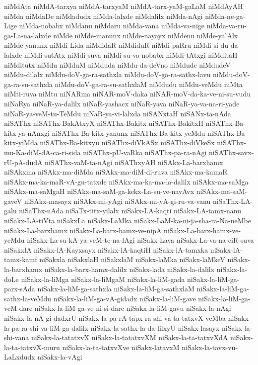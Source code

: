 {niMdAta
niMdA-tarxya
niMdA-tarxyaM
niMdA-tarx-yaM-gaLaM
niMdAyAH
niMda
niMdaDe
niMdadudx
niMda-lalxde
niMdalilx
niMda-nAgi
niMda-ne-ga-Lige
niMda-nobabx
niMdanu
niMdaru
niMda-vana
niMda-va-nige
niMda-va-ru-ga-La-na-lalxde
niMde
niMde-manunx
niMde-nayayx
niMdenu
niMde-yalAlx
niMde-yanunx
niMdi-Lida
niMdidaR
niMdiduR
niMdi-paRru
niMdi-si-du-da-lalxde
niMdi-sutAtx
niMdi-suva
niMdi-su-va-nobabx
niMdi-tAtxgi
niMditaH
niMditutx
niMdu
niMduM
niMduda
niMdu-da-deVno
niMdude
niMdudeV
niMdu-dilalx
niMdu-doV-ga-ra-sathxla
niMdu-doV-ga-ra-sathx-lavu
niMdu-doV-ga-ra-su-sathxla
niMdu-doV-ga-ra-su-sathxlaM
niMdudu
niMdu-veMdu
niMta
niMti-ruva
niMtu
niNARma
niNAR-moV-daka
niNAR-moV-da-ka-ve-ni-su-vudu
niNaRya
niNaR-ya-dalilx
niNaR-yashacx
niNaR-yava
niNaR-ya-va-na-ri-yade
niNaR-ya-veM-tu-TeMdu
niNaR-ya-vi-lalxda
niSANxtaH
niSANx-ta-nAda
niSAThx
niSAThx-BakAtxyX
niSAThx-Bakitx
niSAThx-BakitxH
niSAThx-Ba-kitx-ya-nAnxgi
niSAThx-Ba-kitx-yanunx
niSAThx-Ba-kitx-yeMdu
niSAThx-Ba-kitx-yiMda
niSAThx-Ba-kitxyu
niSAThx-diVkASx
niSAThx-diVkeSx
niSAThx-mu-Ka-diM-dA-ca-ri-sida
niSAThx-pU-vaRka
niSAThx-pa-ra-nAgi
niSAThx-savx-rU-pA-dudA
niSAThx-vaM-ta-nAgi
niSAThxyAH
niSAkx-La-barxhamx
niSAkxma
niSAkx-ma-diMda
niSAkx-ma-diM-di-ruva
niSAkx-ma-kamaR
niSAkx-ma-ka-maR-vA-gu-tatxde
niSAkx-ma-ka-ma-la-dalilx
niSAkx-ma-saMga
niSAkx-ma-saMgaH
niSAkx-ma-saM-ga-kekx-La-su-ve-navAvx
niSAkx-ma-saM-gaveV
niSAkx-masayx
niSAkx-mi-yAgi
niSAkx-mi-yA-gi-ru-va-vanu
niSaThx-LA-galu
niSaThx-nAda
niSaTx-titx-yilalx
niSakx-LA-kaqti
niSakx-LA-tamx-nanu
niSakx-LA-tiVta
niSakxLa
niSakx-LaMka
niSakx-LaM-ka-ni-ja-sha-ra-Na-neMbe
niSakx-La-barxhamx
niSakx-La-barx-hamx-ve-nipA
niSakx-La-barx-hamx-ve-yeMdu
niSakx-La-su-kA-ya-veM-te-na-lAgi
niSakx-Lava
niSakx-La-va-na-ciR-suva
niSakxlA
niSakx-lA-Kayxsayx
niSakx-lA-kaqtiH
niSakx-lA-tamxka
niSakx-lA-tamx-kamf
niSakxla
niSakxlaH
niSakxlaM
niSakx-laMka
niSakx-laMkeV
niSakx-la-barxhamx
niSakx-la-barx-hamx-dalilx
niSakx-lada
niSakx-la-dalilx
niSakx-la-doLe
niSakx-la-liMga
niSakx-la-liMgaM
niSakx-la-liM-gada
niSakx-la-liM-ga-parx-sAda
niSakx-la-liM-ga-sathxla
niSakx-la-liM-ga-sathxlaM
niSakx-la-liM-ga-sathx-la-veMdu
niSakx-la-liM-ga-vA-gidadx
niSakx-la-liM-gave
niSakx-la-liM-ga-veM-dare
niSakx-la-liM-ga-ve-ni-si-dare
niSakx-la-liM-gavu
niSakx-la-nAgi
niSakx-la-nA-gi-dadxrU
niSakx-la-pa-rA-tapx-ra-shi-va-ta-tatxvX-veMba
niSakx-la-pa-ra-shi-va-liM-ga-dalilx
niSakx-la-sathx-la-da-lilxyU
niSakx-lasayx
niSakx-la-shi-vana
niSakx-la-tatatxvX
niSakx-la-tatatxvXM
niSakx-la-ta-tatxvXdA
niSakx-la-ta-tatxvX-muru
niSakx-la-ta-tatxvXve
niSakx-latavxM
niSakx-la-tavx-vu-LaLxdudx
niSakx-la-vAgi
}
